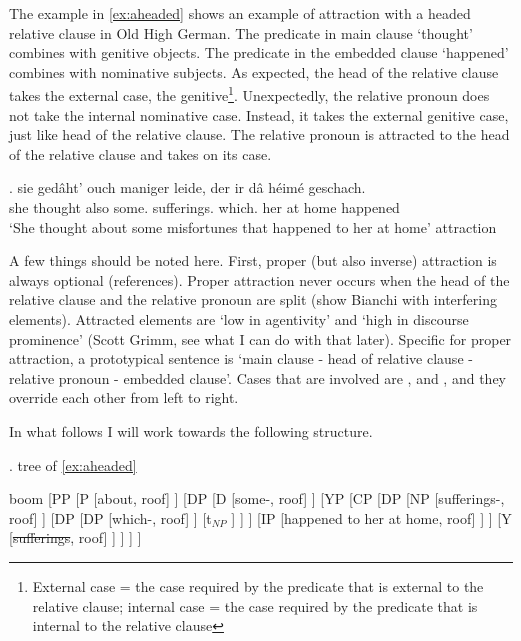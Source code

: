 The example in \ref{ex:aheaded} shows an example of attraction with a headed relative clause in Old High German. The predicate in main clause  `thought' combines with genitive objects. The predicate in the embedded clause  `happened' combines with nominative subjects. As expected, the head of the relative clause takes the external case, the genitive\footnote{External case = the case required by the predicate that is external to the relative clause; internal case = the case required by the predicate that is internal to the relative clause}. Unexpectedly, the relative pronoun does not take the internal nominative case. Instead, it takes the external genitive case, just like head of the relative clause. The relative pronoun is attracted to the head of the relative clause and takes on its case.

\exg. sie gedâht' ouch maniger leide, der ir dâ héimé geschach.\\
she thought also some. sufferings. which. her at home happened\\
`She thought about some misfortunes that happened to her at home' \label{ex:aheaded}\hfill attraction

A few things should be noted here. First, proper (but also inverse) attraction is always optional (references). Proper attraction never occurs when the head of the relative clause and the relative pronoun are split (show Bianchi with interfering elements). Attracted elements are `low in agentivity' and `high in discourse prominence' (Scott Grimm, see what I can do with that later). Specific for proper attraction, a prototypical sentence is `main clause - head of relative clause - relative pronoun - embedded clause'. Cases that are involved are ,  and , and they override each other from left to right.

In what follows I will work towards the following structure.

\ex. tree of \ref{ex:aheaded}\\
	\begin{forest} boom
	[PP
			[P
					[about, roof]
			]
			[DP
					[D
							[some-, roof]
					]
					[YP
							[CP
									[DP
											[NP
													[sufferings-, roof]
											]
											[DP
													[DP
															[which-, roof]
													]
													[t$_{NP}$ ]
											]
									]
									[IP
											[happened to her at home, roof]
									]
							]
							[Y
									[\sout{sufferings}, roof]
							]
					]
			]
	]
	\end{forest}

